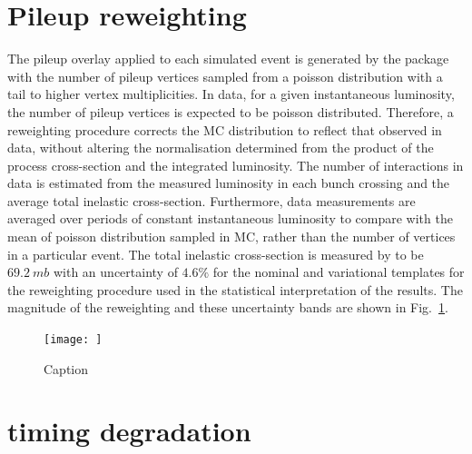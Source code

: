 \section{Pileup reweighting}

The pileup overlay applied to each simulated event is generated by the \PYTHIA
package with the number of pileup vertices sampled from a poisson distribution
with a tail to higher vertex multiplicities. In data, for a given
instantaneous luminosity, the number of pileup vertices is expected to be
poisson distributed. Therefore, a reweighting procedure corrects the MC
distribution to reflect that observed in data, without altering the
normalisation determined from the product of the process cross-section and the
integrated luminosity. The number of interactions in data is estimated from
the measured luminosity in each bunch crossing and the average total inelastic
cross-section. Furthermore, data measurements are averaged over periods of
constant instantaneous luminosity to compare with the mean of poisson
distribution sampled in MC, rather than the number of vertices in a particular
event. The total inelastic cross-section is measured by \CMS to be
${\SI{69.2}{mb}}$ with an uncertainty of $4.6\%$ for the nominal and
variational templates for the reweighting procedure used in the statistical
interpretation of the results. The magnitude of the reweighting and these
uncertainty bands are shown in Fig.~\ref{fig:pu-reweighting}.

\begin{figure}[htbp]
    \centering
    \texttt{[image: ]}
    \caption{Caption}
    \label{fig:pu-reweighting}
\end{figure}


\section{\ECAL timing degradation}

